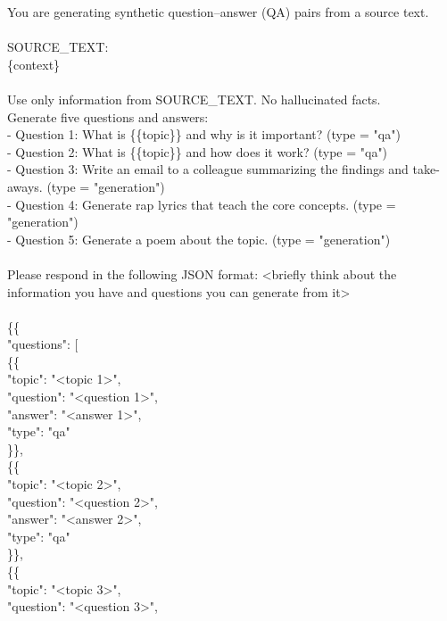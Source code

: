 \documentclass{article} %
\newcommand{\tab}{\hspace*{2em}}
\begin{document}
\begin{examplebox}
    \ttfamily
You are generating synthetic question–answer (QA) pairs from a source text.
\\\\
SOURCE\_TEXT:\\
\{context\}
\\\\
Use only information from SOURCE\_TEXT. No hallucinated facts. \\
Generate five questions and answers: \\
- Question 1: What is \{\{topic\}\} and why is it important? (type = "qa") \\
- Question 2: What is \{\{topic\}\} and how does it work? (type = "qa") \\
- Question 3: Write an email to a colleague summarizing the findings and take-aways. (type = "generation") \\
- Question 4: Generate rap lyrics that teach the core concepts. (type = "generation") \\
- Question 5: Generate a poem about the topic. (type = "generation")
\\\\
Please respond in the following JSON format:
<briefly think about the information you have and questions you can generate from it>
\\\\
\{\{ \\
\tab "questions": [ \\
\tab \tab \{\{ \\
\tab \tab \tab"topic": "<topic 1>", \\
\tab \tab \tab"question": "<question 1>", \\
\tab \tab \tab"answer": "<answer 1>", \\
\tab \tab \tab"type": "qa" \\
\tab \tab \}\}, \\
\tab \tab \{\{ \\
\tab \tab \tab"topic": "<topic 2>", \\
\tab \tab \tab"question": "<question 2>", \\
\tab \tab \tab"answer": "<answer 2>", \\
\tab \tab \tab"type": "qa" \\
\tab \tab \}\}, \\
\tab \tab \{\{ \\
\tab \tab \tab"topic": "<topic 3>", \\
\tab \tab \tab"question": "<question 3>", \\

\end{examplebox}
\end{document}
